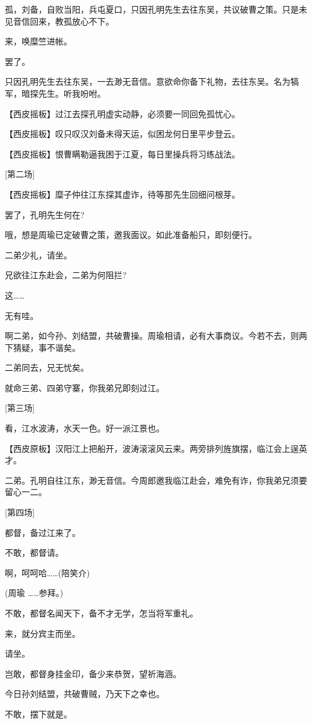 孤，刘备，自败当阳，兵屯夏口，只因孔明先生去往东吴，共议破曹之策。只是未见音信回来，教孤放心不下。

来，唤糜竺进帐。

罢了。

只因孔明先生去往东吴，一去渺无音信。意欲命你备下礼物，去往东吴。名为犒军，暗探先生。听我吩咐。

【西皮摇板】过江去探孔明虚实动静，必须要一同回免孤忧心。

【西皮摇板】叹只叹汉刘备未得天运，似困龙何日里平步登云。

【西皮摇板】恨曹瞒勒逼我困于江夏，每日里操兵将习练战法。

{[}第二场{]}

【西皮摇板】糜子仲往江东探其虚诈，待等那先生回细问根芽。

罢了，孔明先生何在?

哦，想是周瑜已定破曹之策，邀我面议。如此准备船只，即刻便行。

二弟少礼，请坐。

兄欲往江东赴会，二弟为何阻拦?

这\ldots{}\ldots{}

无有哇。

啊二弟，如今孙、刘结盟，共破曹操。周瑜相请，必有大事商议。今若不去，则两下猜疑，事不谐矣。

二弟同去，兄无忧矣。

就命三弟、四弟守寨，你我弟兄即刻过江。

{[}第三场{]}

看，江水波涛，水天一色。好一派江景也。

【西皮原板】汉阳江上把船开，波涛滚滚风云来。两旁排列旌旗摆，临江会上逞英才。

二弟。孔明自往江东，渺无音信。今周郎邀我临江赴会，难免有诈，你我弟兄须要留心一二。

{[}第四场{]}

都督，备过江来了。

不敢，都督请。

啊，呵呵哈\ldots{}\ldots{}(陪笑介)

(周瑜 \ldots{}\ldots{}参拜。)

不敢，都督名闻天下，备不才无学，怎当将军重礼。

来，就分宾主而坐。

请坐。

岂敢，都督身挂金印，备少来恭贺，望祈海涵。

今日孙刘结盟，共破曹贼，乃天下之幸也。

不敢，摆下就是。

